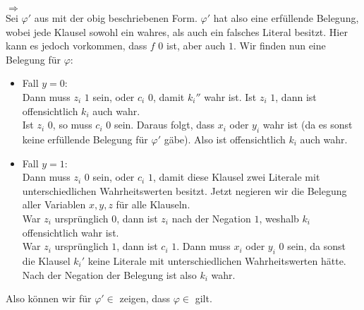 \documentclass[a4paper,11pt]{scrartcl}
\renewcommand{\phi}{\varphi}
\begin{document}
	 $\Rightarrow$ \\
		Sei $\phi'$ aus  mit der obig beschriebenen Form. $\phi'$ hat also eine erfüllende Belegung, wobei jede Klausel sowohl ein wahres, als auch ein falsches Literal besitzt. Hier kann es jedoch vorkommen, dass $f$ $0$ ist, aber auch $1$. Wir finden nun eine Belegung für $\phi$:
		\begin{itemize}
		\item	Fall $y=0$:\\
				Dann muss $z_i$ $1$ sein, oder $c_i$ $0$, damit $k_i''$ wahr ist. Ist $z_i$ $1$, dann ist offensichtlich $k_i$ auch wahr.\\
				Ist $z_i$ $0$, so muss $c_i$ $0$ sein. Daraus folgt, dass $x_i$ oder $y_i$ wahr ist (da es sonst keine erfüllende Belegung für $\phi'$ gäbe). Also ist offensichtlich $k_i$ auch wahr.
		
		\item	Fall $y=1$:\\
				Dann muss $z_i$ $0$ sein, oder $c_i$ $1$, damit diese Klausel zwei Literale mit unterschiedlichen Wahrheitswerten besitzt. Jetzt negieren wir die Belegung aller Variablen $x, y, z$ für alle Klauseln.\\
				War $z_i$ ursprünglich $0$, dann ist $z_i$ nach der Negation $1$, weshalb $k_i$ offensichtlich wahr ist.\\
				War $z_i$ ursprünglich $1$, dann ist $c_i$ $1$. Dann muss $x_i$ oder $y_i$ $0$ sein, da sonst die Klausel $k_i'$ keine Literale mit unterschiedlichen Wahrheitswerten hätte. Nach der Negation der Belegung ist also $k_i$ wahr.
		\end{itemize}
		Also können wir für $\phi' \in$ zeigen, dass $\phi \in$ gilt.
		
\newpage
	
\end{document}

